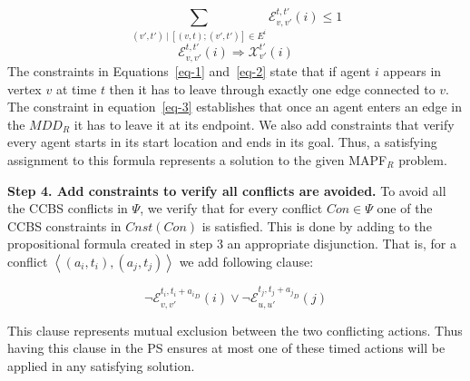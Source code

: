 \documentclass[review]{elsarticle}
\newcommand{\tuple}[1]{\ensuremath{\left \langle #1 \right \rangle }}
\newcommand{\mddr}{\ensuremath{MDD_R}\xspace}
\newcommand{\ccbs}{\ac{CCBS}\xspace}
\newcommand{\ps}{\ac{PS}\xspace}
\newcommand{\mapfr}{\ac{MAPF}$_R$\xspace}
\begin{document}
\begin{equation}
{  \sum_{(v',t')\:|\:[(v,t);(v',t')] \in E^i }{\mathcal{E}_{v,v'}^{t,t'}{(i)} \leq 1}
}
\label{eq-2}
\end{equation}
\begin{equation}
{  \mathcal{E}_{v,v'}^{t,t'}(i) \Rightarrow \mathcal{X}_{v'}^{t'}(i)
}
\label{eq-3}
\end{equation}
The constraints in Equations~\ref{eq-1} and~\ref{eq-2} state that if agent $i$ appears in vertex $v$ at time $t$ then it has to leave through exactly one edge connected to $v$. 
The constraint in equation~\ref{eq-3} establishes that once an agent enters an edge in the \mddr it has to leave it at its endpoint. 
We also add constraints that verify every agent starts in its start location and ends in its goal.
Thus, a satisfying assignment to this formula represents a solution to the given \mapfr problem. 


\textbf{Step 4. Add constraints to verify all conflicts are avoided.}
To avoid all the \ccbs conflicts in $\Psi$, we verify that for every conflict $Con\in\Psi$ one of the \ccbs constraints in $Cnst(Con)$ is satisfied. 
This is done by adding to the propositional formula created in step 3 
an appropriate disjunction. 
That is, for a conflict $\tuple{(a_i,t_i), (a_j, t_j)}$ 
we add following clause:

\begin{equation}
	\neg \mathcal{E}^{t_i, t_i+{a_i}_D}_{v,v'}(i)
\vee
	\neg \mathcal{E}^{t_j, t_j+{a_j}_D}_{u,u'}(j)
\label{eq-mutex}
\end{equation}

This clause represents mutual exclusion between the two conflicting actions. 
Thus having this clause in the \ps ensures at most one of these timed actions will be applied in any satisfying solution. 
\end{document}
